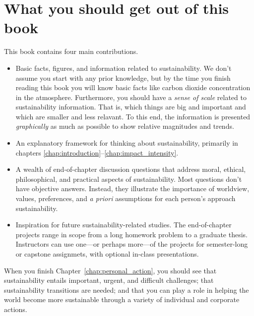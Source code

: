 {%
\section*{What you should get out of this book} 

This book contains four main contributions.

\begin{itemize}

  \item Basic facts, figures, and information related to sustainability. 
        We don't assume you start with any prior knowledge, but by the time you finish 
        reading this book you will know basic facts like carbon dioxide 
        concentration in the atmosphere. 
        Furthermore, you should have a \emph{sense of scale} related to sustainability 
        information. 
        That is, which things are big and important and 
        which are smaller and less relavant. 
        To this end, the information is presented \emph{graphically} as much as possible 
        to show relative magnitudes and trends.
        
  \item An explanatory framework for thinking about sustainability,
        primarily in chapters \ref{chap:introduction}--\ref{chap:impact_intensity}.

  \item A wealth of end-of-chapter discussion questions that 
        address moral, ethical, philosophical,
        and practical aspects of sustainability. 
        Most questions don't have objective answers. 
        Instead, they illustrate the importance
        of worldview, values, preferences, and \emph{a priori} assumptions 
        for each person's approach sustainability. 
        
  \item Inspiration for future sustainability-related studies.
        The end-of-chapter projects range in scope from a long
        homework problem to a graduate thesis. 
        Instructors can use one---or perhaps more---of the projects for
        semester-long or capstone assignmets,
        with optional in-class presentations.
      
\end{itemize}

When you finish Chapter~\ref{chap:personal_action}, you should see
that sustainability entails important, urgent, and difficult challenges; 
that sustainability transitions are needed; and 
that you can play a role in helping the world become more sustainable
through a variety of individual and corporate actions.


}
